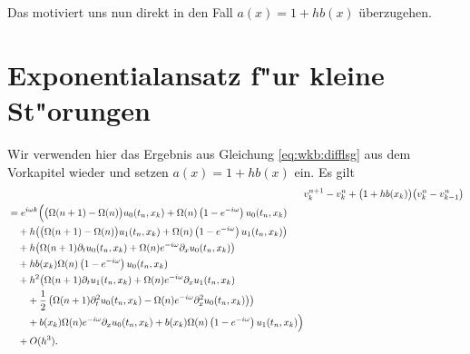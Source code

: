 Das motiviert uns nun direkt in den Fall $a(x) = 1 + hb(x)$ überzugehen.

\section{Exponentialansatz f"ur kleine St"orungen}

Wir verwenden hier das Ergebnis aus Gleichung \eqref{eq:wkb:difflsg} aus dem Vorkapitel wieder und setzen $a(x) = 1 + hb(x)$ ein.
Es gilt
\begin{align}
\nonumber
&v^{n+1}_k - v^n_k + \bigl(1 + hb(x_k)\bigr) \bigl( v^n_k - v^n_{k-1} \bigr)\\
\begin{split}\label{eq:wkb:letzteglg}
&= e^{i \omega k} \Bigl(
\bigl(\Omega(n+1) - \Omega(n) \bigr) u_0(t_n, x_k) + \Omega(n) \left(1-e^{-i \omega}\right) u_0(t_n, x_k)\\
&\quad + h \bigl( \bigl(\Omega(n+1) - \Omega(n) \bigr) u_1(t_n, x_k) + \Omega(n) \left(1-e^{-i \omega}\right) u_1(t_n, x_k) \bigr)\\
&\quad + h \bigl( \Omega(n+1) \partial_t u_0(t_n, x_k) + \Omega(n) e^{-i \omega} \partial_x u_0(t_n, x_k) \bigr)\\
&\quad + h b(x_k) \Omega(n) \left(1-e^{-i \omega}\right) u_0(t_n, x_k)\\
&\quad + h^2 \bigl( \Omega(n+1) \partial_t u_1(t_n, x_k) + \Omega(n) e^{-i \omega} \partial_x u_1(t_n, x_k)\\
&\qquad + \frac{1}{2} \left( \Omega(n+1) \partial^2_t u_0(t_n, x_k) - \Omega(n) e^{-i \omega} \partial^2_x u_0(t_n, x_k) \right) \bigr)\\
&\qquad + b(x_k) \Omega(n) e^{-i \omega} \partial_x u_0(t_n, x_k) + b(x_k) \Omega(n) \left(1-e^{-i \omega}\right) u_1(t_n, x_k)
\Bigr)\\&\quad + O(h^3).
\end{split}
\end{align}
